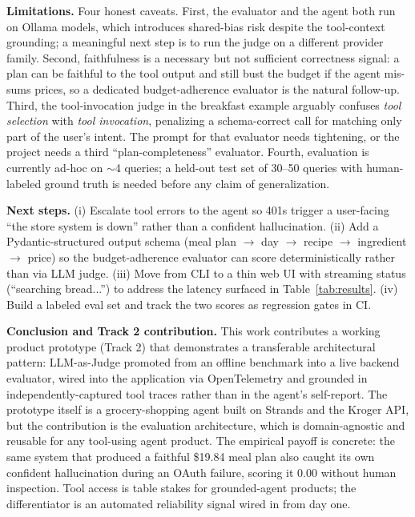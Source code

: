 \documentclass{article}
\begin{document}
\textbf{Limitations.} Four honest caveats. First, the evaluator and the agent both run on Ollama models, which introduces shared-bias risk despite the tool-context grounding; a meaningful next step is to run the judge on a different provider family. Second, faithfulness is a necessary but not sufficient correctness signal: a plan can be faithful to the tool output and still bust the budget if the agent mis-sums prices, so a dedicated budget-adherence evaluator is the natural follow-up. Third, the tool-invocation judge in the breakfast example arguably confuses \emph{tool selection} with \emph{tool invocation}, penalizing a schema-correct call for matching only part of the user's intent. The prompt for that evaluator needs tightening, or the project needs a third ``plan-completeness'' evaluator. Fourth, evaluation is currently ad-hoc on $\sim$4 queries; a held-out test set of 30--50 queries with human-labeled ground truth is needed before any claim of generalization.

\textbf{Next steps.} (i) Escalate tool errors to the agent so 401s trigger a user-facing ``the store system is down'' rather than a confident hallucination. (ii) Add a Pydantic-structured output schema (meal plan $\to$ day $\to$ recipe $\to$ ingredient $\to$ price) so the budget-adherence evaluator can score deterministically rather than via LLM judge. (iii) Move from CLI to a thin web UI with streaming status (``searching bread...'') to address the latency surfaced in Table~\ref{tab:results}. (iv) Build a labeled eval set and track the two scores as regression gates in CI.

\textbf{Conclusion and Track 2 contribution.} This work contributes a working product prototype (Track 2) that demonstrates a transferable architectural pattern: LLM-as-Judge promoted from an offline benchmark into a live backend evaluator, wired into the application via OpenTelemetry and grounded in independently-captured tool traces rather than in the agent's self-report. The prototype itself is a grocery-shopping agent built on Strands and the Kroger API, but the contribution is the evaluation architecture, which is domain-agnostic and reusable for any tool-using agent product. The empirical payoff is concrete: the same system that produced a faithful \$19.84 meal plan also caught its own confident hallucination during an OAuth failure, scoring it 0.00 without human inspection. Tool access is table stakes for grounded-agent products; the differentiator is an automated reliability signal wired in from day one.
\end{document}
